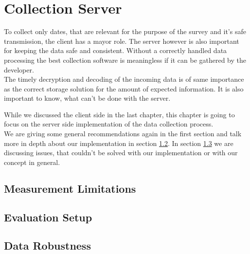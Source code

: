 \chapter{Collection Server}
\label{chap:mmeasurement}
To collect only dates, that are relevant for the purpose of the survey and it's safe transmission, the client has a mayor role. The server however is also important for keeping the data safe and consistent. Without a correctly handled data processing the best collection software is meaningless if it can be gathered by the developer.\\
The timely decryption and decoding of the incoming data is of same importance as the correct storage solution for the amount of expected information. It is also important to know, what can't be done with the server.

While we discussed the client side in the last chapter, this chapter is going to focus on
the server side implementation of the data collection process.\\
We are giving some general recommendations again in the first section and talk more in depth about our implementation in section \ref{sec:measurement:eval_setup}.
In section \ref{sec:measurement:robust} we are discussing issues, that couldn't be solved with our implementation or with our concept in general.
%


\section{Measurement Limitations}
\label{sec:measurement:limits}
%

%

\section{Evaluation Setup}
\label{sec:measurement:eval_setup}
%


%
\newpage
%
 

\section{Data Robustness}
\label{sec:measurement:robust}
%


